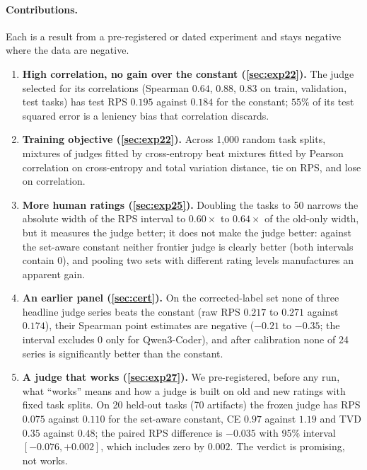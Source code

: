 \paragraph{Contributions.}
Each is a result from a pre-registered or dated experiment and stays negative where the data are negative.
\begin{enumerate}
\item \textbf{High correlation, no gain over the constant (\cref{sec:exp22}).} The judge selected for its correlations (Spearman $0.64$, $0.88$, $0.83$ on train, validation, test tasks) has test RPS $0.195$ against $0.184$ for the constant; $55\%$ of its test squared error is a leniency bias that correlation discards.
\item \textbf{Training objective (\cref{sec:exp22}).} Across 1{,}000 random task splits, mixtures of judges fitted by cross-entropy beat mixtures fitted by Pearson correlation on cross-entropy and total variation distance, tie on RPS, and lose on correlation.
\item \textbf{More human ratings (\cref{sec:exp25}).} Doubling the tasks to 50 narrows the absolute width of the RPS interval to $0.60\times$ to $0.64\times$ of the old-only width, but it measures the judge better; it does not make the judge better: against the set-aware constant neither frontier judge is clearly better (both intervals contain $0$), and pooling two sets with different rating levels manufactures an apparent gain.
\item \textbf{An earlier panel (\cref{sec:cert}).} On the corrected-label set none of three headline judge series beats the constant (raw RPS $0.217$ to $0.271$ against $0.174$), their Spearman point estimates are negative ($-0.21$ to $-0.35$; the interval excludes $0$ only for Qwen3-Coder), and after calibration none of 24 series is significantly better than the constant.
\item \textbf{A judge that works (\cref{sec:exp27}).} We pre-registered, before any run, what ``works'' means and how a judge is built on old and new ratings with fixed task splits. On 20 held-out tasks (70 artifacts) the frozen judge has RPS $0.075$ against $0.110$ for the set-aware constant, CE $0.97$ against $1.19$ and TVD $0.35$ against $0.48$; the paired RPS difference is $-0.035$ with 95\% interval $[-0.076,+0.002]$, which includes zero by $0.002$. The verdict is promising, not works.
\end{enumerate}
